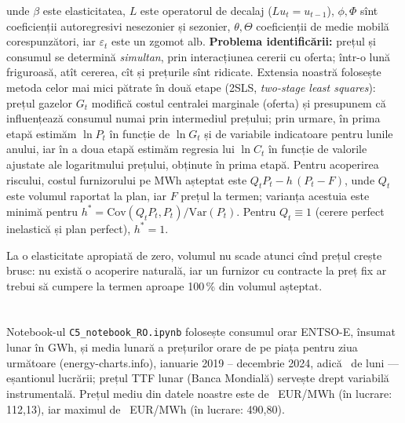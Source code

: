{unde $\beta$ este elasticitatea, $L$ este operatorul de decalaj ($L u_t=u_{t-1}$), $\phi,\Phi$ sînt coeficienții autoregresivi nesezonier și sezonier, $\theta,\Theta$ coeficienții de medie mobilă corespunzători, iar $\varepsilon_t$ este un zgomot alb.
\textbf{Problema identificării:} prețul și consumul se determină \emph{simultan}, prin interacțiunea cererii cu oferta; într-o lună friguroasă, atît cererea, cît și prețurile sînt ridicate.
Extensia noastră folosește metoda celor mai mici pătrate în două etape (2SLS, \emph{two-stage least squares}): prețul gazelor $G_t$ modifică costul centralei marginale (oferta) și presupunem că influențează consumul numai prin intermediul prețului; prin urmare, în prima etapă estimăm $\ln P_t$ în funcție de $\ln G_t$ și de variabile indicatoare pentru lunile anului, iar în a doua etapă estimăm regresia lui $\ln C_t$ în funcție de valorile ajustate ale logaritmului prețului, obținute în prima etapă.
Pentru acoperirea riscului, costul furnizorului pe MWh așteptat este $Q_tP_t-h\,(P_t-F)$, unde $Q_t$ este volumul raportat la plan, iar $F$ prețul la termen; varianța acestuia este minimă pentru $h^*=\mathrm{Cov}(Q_tP_t,P_t)/\mathrm{Var}(P_t)$. Pentru $Q_t\equiv1$ (cerere perfect inelastică și plan perfect), $h^*=1$.}
\begin{decision}
%
{La o elasticitate apropiată de zero, volumul nu scade atunci cînd prețul crește brusc: nu există o acoperire naturală, iar un furnizor cu contracte la preț fix ar trebui să cumpere la termen aproape 100\,\% din volumul așteptat.}
\end{decision}

\section{}
%
{Notebook-ul \texttt{C5\_notebook\_RO.ipynb} folosește consumul orar ENTSO-E, însumat lunar în GWh, și media lunară a prețurilor orare de pe piața pentru ziua următoare (energy-charts.info), ianuarie 2019 -- decembrie 2024, adică \NnMonths\ de luni --- eșantionul lucrării;
prețul TTF lunar (Banca Mondială) servește drept variabilă instrumentală. Prețul mediu din datele noastre este de \NmeanPrice\ EUR/MWh (în lucrare: 112,13), iar maximul de \NmaxPrice\ EUR/MWh (în lucrare: 490,80).}

